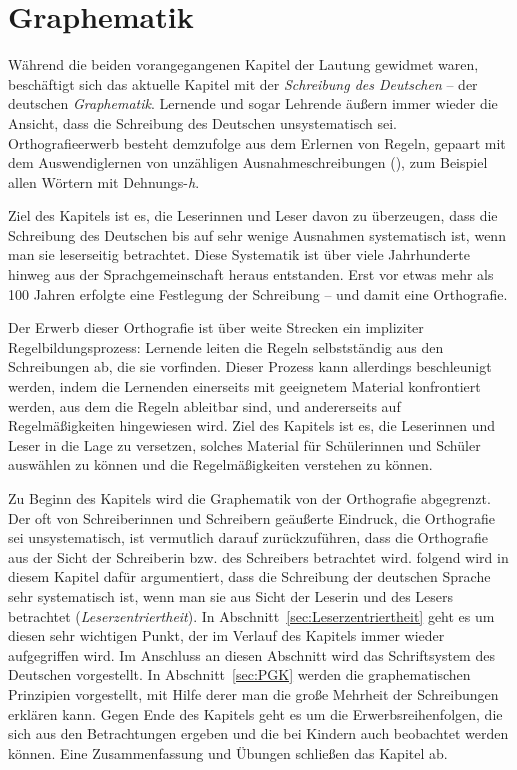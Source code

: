 \chapter{Graphematik}\label{kap:Graphematik}

Während die beiden vorangegangenen Kapitel der Lautung gewidmet waren, beschäftigt sich das aktuelle Kapitel mit der \textit{Schreibung des Deutschen} -- der deutschen \textit{Graphematik}. Lernende und sogar Lehrende äußern immer wieder die Ansicht, dass die Schreibung des Deutschen unsystematisch sei. Orthografieerwerb besteht demzufolge aus dem Erlernen von Regeln, gepaart mit dem Auswendiglernen von unzähligen Ausnahmeschreibungen (), zum Beispiel allen Wörtern mit Dehnungs-\textit{h}. 

Ziel des Kapitels ist es, die Leserinnen und Leser davon zu überzeugen, dass die Schreibung des Deutschen bis auf sehr wenige Ausnahmen systematisch ist, wenn man sie leserseitig betrachtet. Diese Systematik ist über viele Jahrhunderte hinweg aus der Sprachgemeinschaft heraus entstanden. Erst vor etwas mehr als 100 Jahren erfolgte eine Festlegung der Schreibung -- und damit eine Orthografie. 

Der Erwerb dieser Orthografie ist über weite Strecken ein impliziter Regelbildungsprozess: Lernende leiten die Regeln selbstständig aus den Schreibungen ab, die sie vorfinden. Dieser Prozess kann allerdings beschleunigt werden, indem die Lernenden einerseits mit geeignetem Material konfrontiert werden, aus dem die Regeln ableitbar sind, und andererseits auf Regelmäßigkeiten hingewiesen wird. Ziel des Kapitels ist es, die Leserinnen und Leser in die Lage zu versetzen, solches Material für Schülerinnen und Schüler auswählen zu können und die Regelmäßigkeiten verstehen zu können.

Zu Beginn des Kapitels wird die Graphematik von der Orthografie abgegrenzt. Der oft von Schreiberinnen und Schreibern geäußerte Eindruck, die Orthografie sei unsystematisch, ist vermutlich darauf zurückzuführen, dass die Orthografie aus der Sicht der Schreiberin bzw. des Schreibers betrachtet wird. \citet[3]{Bredeletal2017} folgend wird in diesem Kapitel dafür argumentiert, dass die Schreibung der deutschen Sprache sehr systematisch ist, wenn man sie aus Sicht der Leserin und des Lesers betrachtet (\textit{Leserzentriertheit}). In Abschnitt~\ref{sec:Leserzentriertheit} geht es um diesen sehr wichtigen Punkt, der im Verlauf des Kapitels immer wieder aufgegriffen wird. Im Anschluss an diesen Abschnitt wird das Schriftsystem des Deutschen vorgestellt. In Abschnitt~\ref{sec:PGK} werden die graphematischen Prinzipien vorgestellt, mit Hilfe derer man die große Mehrheit der Schreibungen erklären kann. Gegen Ende des Kapitels geht es um die Erwerbsreihenfolgen, die sich aus den Betrachtungen ergeben und die bei Kindern auch beobachtet werden können. Eine Zusammenfassung und Übungen schließen das Kapitel ab.


